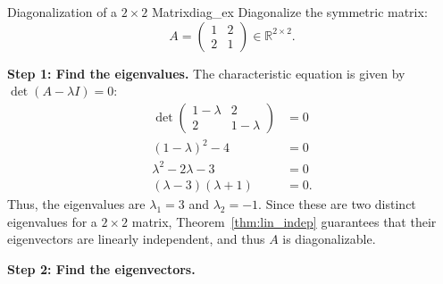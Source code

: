 \documentclass[10pt, letterpaper]{article}
\begin{document}
\begin{example}{Diagonalization of a $2 \times 2$ Matrix}{diag_ex}
    Diagonalize the symmetric matrix:
    \begin{equation*}
        A = \begin{pmatrix} 1 & 2 \\ 2 & 1 \end{pmatrix} \in \mathbb{R}^{2 \times 2}.
    \end{equation*}
    
    \textbf{Step 1: Find the eigenvalues.} The characteristic equation is given by $\det(A - \lambda I) = 0$:
    \begin{align*}
        \det\begin{pmatrix} 1-\lambda & 2 \\ 2 & 1-\lambda \end{pmatrix} &= 0 \\
        (1-\lambda)^2 - 4 &= 0 \\
        \lambda^2 - 2\lambda - 3 &= 0 \\
        (\lambda - 3)(\lambda + 1) &= 0.
    \end{align*}
    Thus, the eigenvalues are $\lambda_1 = 3$ and $\lambda_2 = -1$. Since these are two distinct eigenvalues for a $2 \times 2$ matrix, Theorem~\ref{thm:lin_indep} guarantees that their eigenvectors are linearly independent, and thus $A$ is diagonalizable.
    
    \textbf{Step 2: Find the eigenvectors.}
    

\end{example}
\end{document}
